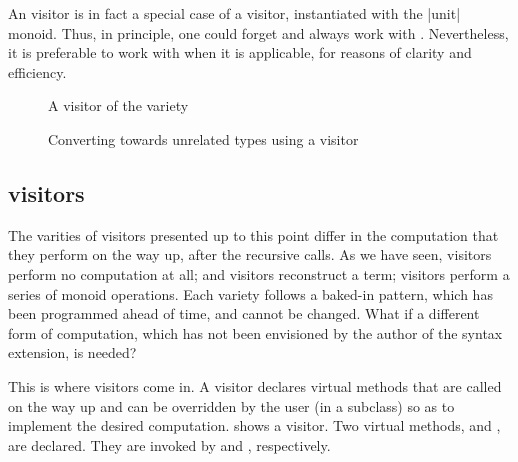 \documentclass[11pt,a4paper,twoside]{article}
\begin{document}
An \iter visitor is in fact a special case of a \reduce visitor, instantiated
with the \oc|unit| monoid. Thus, in principle, one could forget \iter and
always work with \reduce. Nevertheless, it is preferable to work with \iter
when it is applicable, for reasons of clarity and efficiency.



\begin{figure}[p]
\vspace{-\baselineskip}
\caption{A visitor of the \fold variety}
\label{fig:expr00fold}
\end{figure}

\begin{figure}[p]
\caption{Converting towards unrelated types using a \fold visitor}
\label{fig:fold}
\end{figure}

\subsection{\fold visitors}
\label{sec:intro:fold}

The varities of visitors presented up to this point differ in the computation
that they perform on the way up, after the recursive calls. As we have seen,
\iter visitors perform no computation at all; \map and \mapendo visitors
reconstruct a term; \reduce visitors perform a series of monoid operations.
Each variety follows a baked-in pattern, which has been programmed ahead of
time, and cannot be changed. What if a different form of computation, which
has not been envisioned by the author of the \visitors syntax extension, is
needed?

This is where \fold visitors come in. A \fold visitor declares virtual methods
that are called on the way up and can be overridden by the user (in a
subclass) so as to implement the desired computation. 
shows a \fold visitor. Two virtual methods, 
and , are declared. They are invoked by
 and , respectively.
\end{document}
